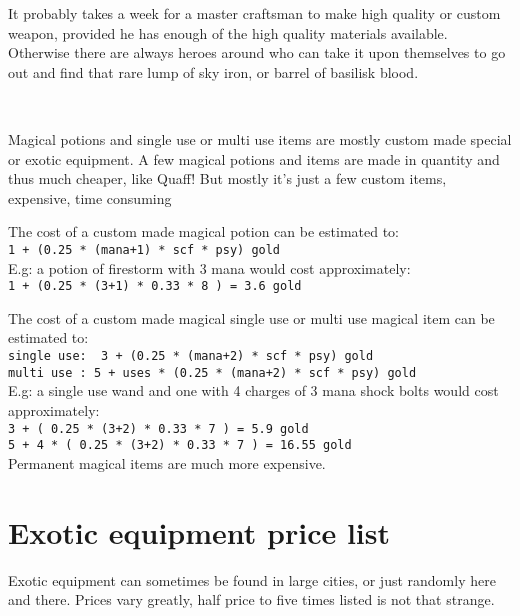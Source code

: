 It probably takes a week for a master craftsman to make high quality or custom weapon, provided he has enough of the high quality materials available. Otherwise there are always heroes around who can take it upon themselves to go out and find that rare lump of sky iron, or barrel of basilisk blood.

\

Magical potions and single use or multi use items are mostly custom made special or exotic equipment. A few magical potions and items are made in quantity and thus much cheaper, like Quaff! But mostly it's just a few custom items, expensive, time consuming

The cost of a custom made magical potion can be estimated to:\\
\verb|1 + (0.25 * (mana+1) * scf * psy) gold| \\
E.g: a potion of firestorm with 3 mana would cost approximately:\\
\verb|1 + (0.25 * (3+1) * 0.33 * 8 ) = 3.6 gold|

The cost of a custom made magical single use or multi use magical item can be estimated to: \\
\verb|single use:  3 + (0.25 * (mana+2) * scf * psy) gold| \\
\verb|multi use : 5 + uses * (0.25 * (mana+2) * scf * psy) gold| \\
E.g: a single use wand and one with 4 charges of 3 mana shock bolts would cost approximately: \\
\verb|3 + ( 0.25 * (3+2) * 0.33 * 7 ) = 5.9 gold| \\            %
\verb|5 + 4 * ( 0.25 * (3+2) * 0.33 * 7 ) = 16.55 gold| \\      %

\noindent Permanent magical items are much more expensive.







\goodbreak
{}
\section*{Exotic equipment price list}

Exotic equipment can sometimes be found in large cities, or just randomly here and there. Prices vary greatly, half price to five times listed is not that strange.

